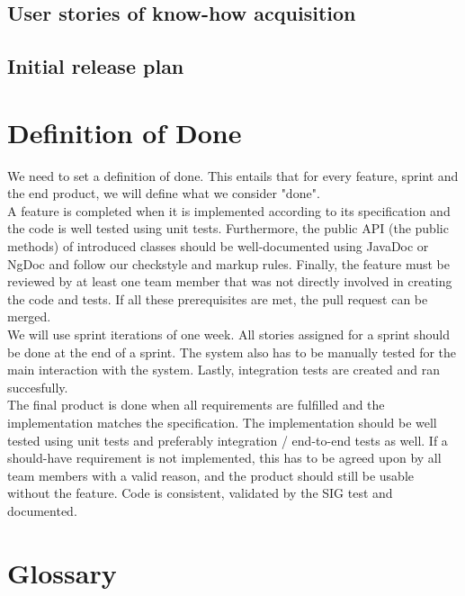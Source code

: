\section{User stories of know-how acquisition}

\section{Initial release plan}


\chapter{Definition of Done}
We need to set a definition of done.
This entails that for every feature, sprint and the end product, we will define what we consider "done".\\

A feature is completed when it is implemented according to its specification and the code is well tested using unit tests.
Furthermore, the public API (the public methods) of introduced classes should be well-documented using JavaDoc or NgDoc and follow our checkstyle and markup rules.
Finally, the feature must be reviewed by at least one team member that was not directly involved in creating the code and tests.
If all these prerequisites are met, the pull request can be merged.\\

We will use sprint iterations of one week. All stories assigned for a sprint should be done at the end of a sprint.
The system also has to be manually tested for the main interaction with the system. Lastly, integration tests are created and ran succesfully.\\

The final product is done when all requirements are fulfilled and the implementation matches the specification. The implementation should be well tested using unit tests and preferably integration / end-to-end tests as well.
If a should-have requirement is not implemented, this has to be agreed upon by all team members with a valid reason, and the product should still be usable without the feature.
Code is consistent, validated by the SIG test and documented.

\chapter{Glossary}